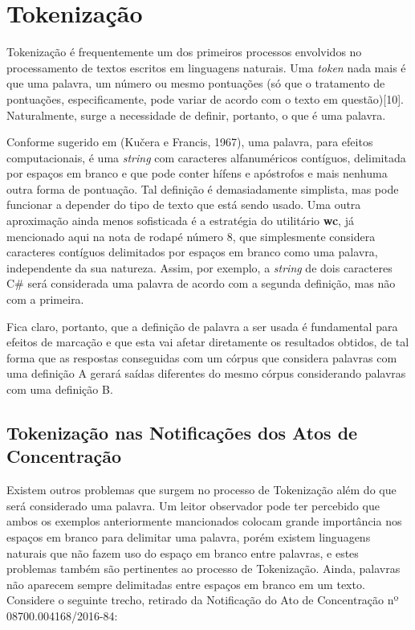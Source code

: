 \documentclass[11pt]{report}
\begin{document}
\section{Tokenização}

\indent\indent Tokenização é frequentemente um dos primeiros processos envolvidos no processamento de textos escritos em linguagens naturais. Uma \textit{token} nada mais é que uma
palavra, um número ou mesmo pontuações (só que o tratamento de pontuações, especificamente, pode variar de acordo com o texto em questão)[10]. Naturalmente, surge a necessidade de
definir, portanto, o que é uma palavra.

Conforme sugerido em (Kučera e Francis, 1967), uma palavra, para efeitos computacionais, é uma \textit{string} com caracteres alfanuméricos
contíguos, delimitada por espaços em branco e que pode conter hífens e apóstrofos e mais nenhuma outra forma de pontuação. Tal definição é demasiadamente simplista,
mas pode funcionar a depender do tipo de texto que está sendo usado. Uma outra aproximação ainda menos sofisticada é a estratégia do utilitário \textbf{wc}, já mencionado
aqui na nota de rodapé número 8, que simplesmente considera caracteres contíguos delimitados por espaços em branco como uma palavra, independente da sua natureza. Assim, por exemplo,
a \textit{string} de dois caracteres C\# será considerada uma palavra de acordo com a segunda definição, mas não com a primeira.

Fica claro, portanto, que a definição de palavra a ser usada é fundamental para efeitos de marcação e que esta vai afetar diretamente os resultados obtidos, de tal forma que as
respostas conseguidas com um córpus que considera palavras com uma definição A gerará saídas diferentes do mesmo córpus considerando palavras com uma definição B.

\subsection{Tokenização nas Notificações dos Atos de Concentração}

\indent\indent Existem outros problemas que surgem no processo de Tokenização além do que será considerado uma palavra. Um leitor observador pode ter percebido que ambos os exemplos anteriormente
mancionados colocam grande importância nos espaços em branco para delimitar uma palavra, porém existem linguagens naturais que não fazem uso do espaço em branco entre palavras, e
estes problemas também são pertinentes ao processo de Tokenização. Ainda, palavras não aparecem sempre delimitadas entre espaços em branco em um texto. Considere o seguinte trecho,
retirado da Notificação do Ato de Concentração nº 08700.004168/2016-84:
\end{document}
